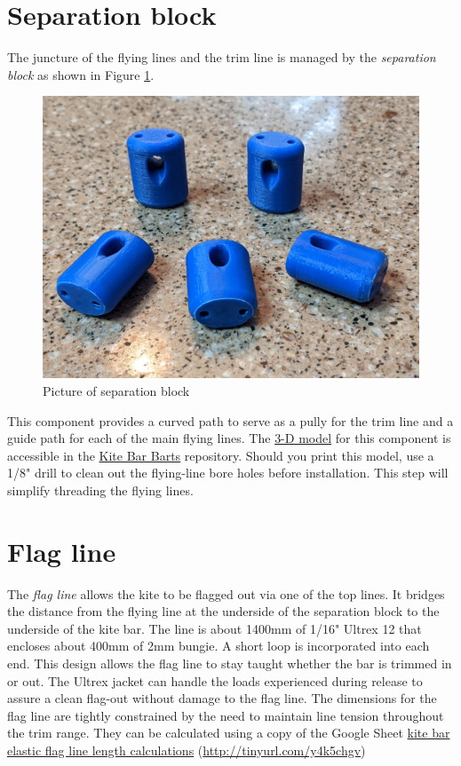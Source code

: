 \documentclass[
]{book}
\begin{document}
\hypertarget{separation-block}{%
\section{Separation block}\label{separation-block}}

The juncture of the flying lines and the trim line is managed by the \emph{separation block} as shown in Figure \ref{fig:separation-block}.

\begin{figure}

{\centering \includegraphics[width=0.7\linewidth]{images/separation_block} 

}

\caption{Picture of separation block}\label{fig:separation-block}
\end{figure}

This component provides a curved path to serve as a pully for the trim line and a guide path for each of the main flying lines. The \href{https://github.com/pbchase/kite_bar_parts/blob/master/printable/separation_block_v2_6mm_trimline_bore_7e61bdd.stl}{3-D model} for this component is accessible in the \href{https://github.com/pbchase/kite_bar_parts}{Kite Bar Barts} repository. Should you print this model, use a 1/8" drill to clean out the flying-line bore holes before installation. This step will simplify threading the flying lines.

\hypertarget{flag-line}{%
\section{Flag line}\label{flag-line}}

The \emph{flag line} allows the kite to be flagged out via one of the top lines. It bridges the distance from the flying line at the underside of the separation block to the underside of the kite bar. The line is about 1400mm of 1/16" Ultrex 12 that encloses about 400mm of 2mm bungie. A short loop is incorporated into each end. This design allows the flag line to stay taught whether the bar is trimmed in or out. The Ultrex jacket can handle the loads experienced during release to assure a clean flag-out without damage to the flag line. The dimensions for the flag line are tightly constrained by the need to maintain line tension throughout the trim range. They can be calculated using a copy of the Google Sheet \href{http://tinyurl.com/y4k5chgv}{kite bar elastic flag line length calculations} (\url{http://tinyurl.com/y4k5chgv})
\end{document}
